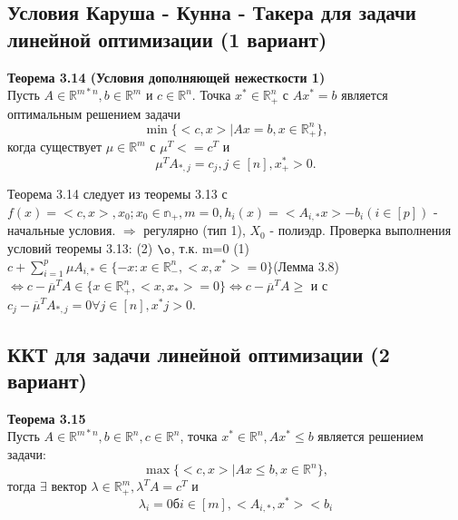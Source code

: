  \subsection{Условия Каруша - Кунна - Такера для задачи линейной оптимизации (1 вариант)}
 {\bf Теорема 3.14 (Условия дополняющей нежесткости 1)}\\
 Пусть $A\in \mathbb{R}^{m*n}, b\in\mathbb{R}^m$ и $c\in\mathbb{R}^n$. Точка $x^*\in \mathbb{R}^n_+$ с $Ax^*=b$ является оптимальным решением задачи
 $$\min{\{<c,x>|Ax=b,x\in\mathbb{R}^n_+\}},$$
когда существует $\mu\in\mathbb{R}^m$ с $\mu^T<=c^T$ и
$$\mu^T A_{*,j}=c_j, j\in[n], x^{*}_{+}>0.$$

Теорема 3.14 следует из теоремы 3.13 с $f(x)=<c,x>,x_0; x_0\in \mathbb{n}_+, m=0, h_i(x)=<A_{i,*}x>-b_i (i\in[p])$ - начальные условия. $\Rightarrow$ регулярно (тип 1), $X_0$ - полиэдр.
Проверка выполнения условий теоремы 3.13:
(2) ${\o}$, т.к. m=0
(1) $\displaystyle c+\sum_{i=1}^{p}\mu A_{i,*}\in\{-x: x\in \mathbb{R}^n_-, <x,x^*>=0\}$(Лемма 3.8) $\Leftrightarrow c-\overline{\mu}^T A\in \{x\in\mathbb{R}^{n}_{+}, <x,x_*>=0\} \Leftrightarrow c-\overline{\mu}^T A\geq$ и с $c_j-\overline{\mu}^T A_{*,j}=0 \forall j\in[n], x^{*}{j}>0$.

\subsection{ККТ для задачи линейной оптимизации (2 вариант)}

{\bf Теорема 3.15}\\
Пусть $A\in\mathbb{R}^{m*n},b\in\mathbb{R}^n, c\in\mathbb{R}^n$, точка $x^*\in\mathbb{R}^n, Ax^*\leq b$ является решением задачи:
$$\max{\{<c,x>|Ax\leq b, x\in\mathbb{R}^n\}},$$
тогда $\exists$ вектор $\lambda\in\mathbb{R}^{m}_{+}, \lambda^T A=c^T$ и
$$\lambda_i=0б i\in[m], <A_{i,*},x^*><b_i$$ 